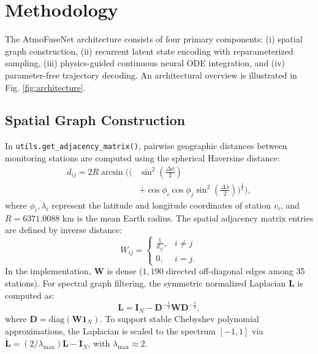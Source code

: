 \documentclass[conference]{IEEEtran}
\begin{document}
\section{Methodology}
The AtmoFuseNet architecture consists of four primary components: (i) spatial graph construction, (ii) recurrent latent state encoding with reparameterized sampling, (iii) physics-guided continuous neural ODE integration, and (iv) parameter-free trajectory decoding. An architectural overview is illustrated in Fig. \ref{fig:architecture}.

\subsection{Spatial Graph Construction}
In \texttt{utils.get\_adjacency\_matrix()}, pairwise geographic distances between monitoring stations are computed using the spherical Haversine distance:
\begin{align}
d_{ij} = 2 R \arcsin \Biggl( \biggl( &\sin^2\left(\frac{\Delta \phi}{2}\right) \nonumber \\
&+ \cos \phi_i \cos \phi_j \sin^2\left(\frac{\Delta \lambda}{2}\right)\biggr)^{\frac{1}{2}} \Biggr),
\label{eq:haversine}
\end{align}
where $\phi_i, \lambda_i$ represent the latitude and longitude coordinates of station $v_i$, and $R = 6371.0088\text{ km}$ is the mean Earth radius. The spatial adjacency matrix entries are defined by inverse distance:
\begin{equation}
W_{ij} = \begin{cases} 
\frac{1}{d_{ij}}, & i \ne j \\
0, & i = j.
\end{cases}
\label{eq:adjacency}
\end{equation}
In the implementation, $\boldsymbol{W}$ is dense ($1,190$ directed off-diagonal edges among 35 stations). For spectral graph filtering, the symmetric normalized Laplacian $\boldsymbol{L}$ is computed as:
\begin{equation}
\boldsymbol{L} = \boldsymbol{I}_N - \boldsymbol{D}^{-\frac{1}{2}} \boldsymbol{W} \boldsymbol{D}^{-\frac{1}{2}},
\label{eq:laplacian}
\end{equation}
where $\boldsymbol{D} = \mathrm{diag}(\boldsymbol{W} \mathbf{1}_N)$. To support stable Chebyshev polynomial approximations, the Laplacian is scaled to the spectrum $[-1, 1]$ via $\widetilde{\boldsymbol{L}} = (2 / \lambda_{\max}) \boldsymbol{L} - \boldsymbol{I}_N$, with $\lambda_{\max} \approx 2$.
\end{document}
